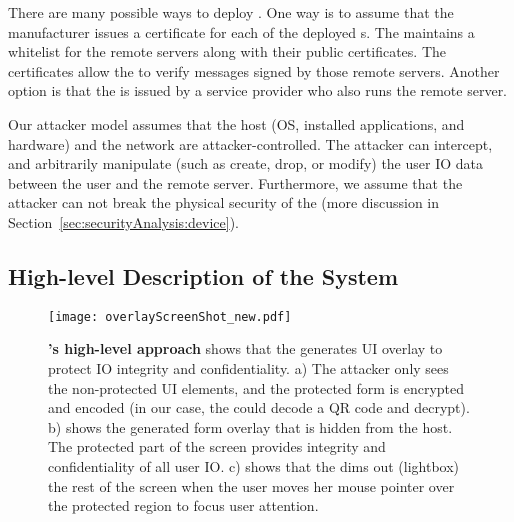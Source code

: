 There are many possible ways to deploy \name. One way is to assume that the \device manufacturer issues a certificate for each of the deployed \device{}s. The \device maintains a whitelist for the remote servers along with their public certificates. The certificates allow the \device to verify messages signed by those remote servers. Another option is that the \device is issued by a service provider who also runs the remote server. 

\parasave
{} Our attacker model assumes that the host (OS, installed applications, and hardware) and the network are attacker-controlled. The attacker can intercept, and arbitrarily manipulate (such as create, drop, or modify) the user IO data between the user and the remote server. Furthermore, we assume that the attacker can not break the physical security of the \device (more discussion in Section~\ref{sec:securityAnalysis:device}).



\subsection{High-level Description of the System}

\begin{figure}[t]
\centering
\texttt{[image: overlayScreenShot\_new.pdf]}
\caption{\textbf{\name's high-level approach} shows that the \device generates UI overlay to protect IO integrity and confidentiality. a) The attacker only sees the non-protected UI elements, and the protected form is encrypted and encoded (in our case, the \device could decode a QR code and decrypt). b) shows the \device generated form overlay that is hidden from the host. The protected part of the screen provides integrity and confidentiality of all user IO. c) shows that the \device dims out (lightbox) the rest of the screen when the user moves her mouse pointer over the protected region to focus user attention.}
\spacesave
\label{fig:screenshot_1}
\end{figure}

